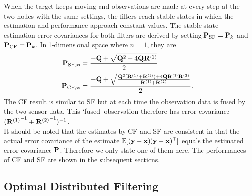 When the target keeps moving and observations are made at every step at the two nodes with the same settings, the filters reach stable states in which the estimation and performance approach constant values. The stable state estimation error covariances for both filters are derived by setting ${\bf P}_\text{SF}={\bf P}_k$ and ${\bf P}_\text{CF}={\bf P}_k$. In 1-dimensional space where $n=1$, they are
\begin{equation}
\begin{split}
{\bf P}_{\text{SF,ss}}&=\frac{-{\bf Q}+\sqrt{{\bf Q}^2+4{\bf Q}{\bf R}^{(1)}}}{2} \\
{\bf P}_{\text{CF,ss}}&=\frac{-{\bf Q}+\sqrt{\frac{{\bf Q}^2({\bf R}^{(1)}+{\bf R}^{(2)})+4{\bf Q}{\bf R}^{(1)}{\bf R}^{(2)}}{{\bf R}^{(1)}+{\bf R}^{(2)}}}}{2}.
\end{split}
\end{equation}
The CF result is similar to SF but at each time the observation data is fused by the two sensor data. This `fused' observation therefore has error covariance $({{\bf R}^{(1)}}^{-1}+{{\bf R}^{(2)}}^{-1})^{-1}$. \\
\indent It should be noted that the estimates by CF and SF are consistent in that the actual error covariance of the estimate $\mathbb{E}[({\bf y}-{\bf x})({\bf y}-{\bf x})^\top]$ equals the estimated error covariance $\bf P$. Therefore we only state one of them here. The performances of CF and SF are shown in the subsequent sections.

\subsection{Optimal Distributed Filtering}
\label{sec:DF}

